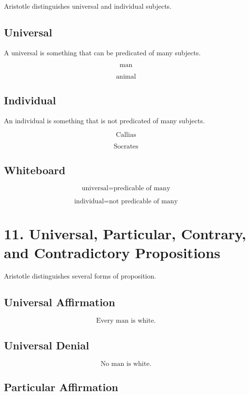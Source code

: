 \documentclass[12pt]{article}
\begin{document}
Aristotle distinguishes universal and individual subjects.

\subsection*{Universal}

A universal is something that can be predicated of many subjects.

\[
\text{man}
\]

\[
\text{animal}
\]

\subsection*{Individual}

An individual is something that is not predicated of many subjects.

\[
\text{Callias}
\]

\[
\text{Socrates}
\]

\subsection*{Whiteboard}

\[
\text{universal} = \text{predicable of many}
\]

\[
\text{individual} = \text{not predicable of many}
\]

\section*{11. Universal, Particular, Contrary, and Contradictory Propositions}

Aristotle distinguishes several forms of proposition.

\subsection*{Universal Affirmation}

\[
\text{Every man is white.}
\]

\subsection*{Universal Denial}

\[
\text{No man is white.}
\]

\subsection*{Particular Affirmation}
\end{document}
